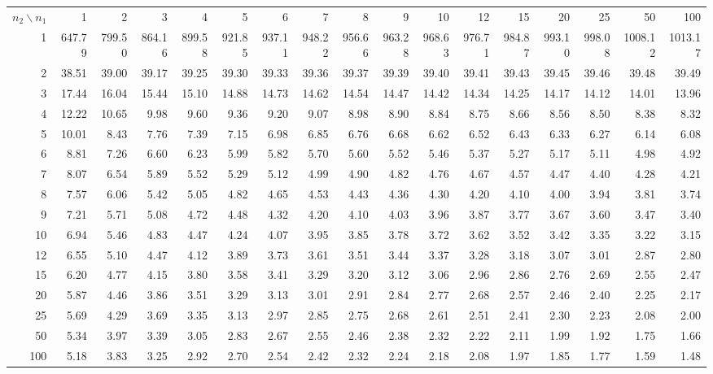 \begin{landscape}
\noindent\begin{tabular}{|*{17}{r|}}
\hline \rowcolor{lightturquoise} \multicolumn{17}{|c|}{97.5--Percentile of  Snedecor's  F--distribution
} \\
  \hline$n_2\backslash n_1$ &  1 & 2 & 3 & 4 & 5 & 6 & 7 & 8 & 9 & 10 & 12 & 15 & 20 & 25 & 50 & 100 \\ 
\hline  1 &  647.79 &  799.50 &  864.16 &  899.58 &  921.85 &  937.11 &  948.22 &  956.66 &  963.28 &  968.63 &  976.71 &  984.87 &  993.10 &  998.08 & 1008.12 & 1013.17 \\ 
\hline  2 & 38.51 & 39.00 & 39.17 & 39.25 & 39.30 & 39.33 & 39.36 & 39.37 & 39.39 & 39.40 & 39.41 & 39.43 & 39.45 & 39.46 & 39.48 & 39.49 \\ 
\hline  3 & 17.44 & 16.04 & 15.44 & 15.10 & 14.88 & 14.73 & 14.62 & 14.54 & 14.47 & 14.42 & 14.34 & 14.25 & 14.17 & 14.12 & 14.01 & 13.96 \\ 
\hline  4 & 12.22 & 10.65 &  9.98 &  9.60 &  9.36 &  9.20 &  9.07 &  8.98 &  8.90 &  8.84 &  8.75 &  8.66 &  8.56 &  8.50 &  8.38 &  8.32 \\ 
\hline  5 & 10.01 &  8.43 &  7.76 &  7.39 &  7.15 &  6.98 &  6.85 &  6.76 &  6.68 &  6.62 &  6.52 &  6.43 &  6.33 &  6.27 &  6.14 &  6.08 \\ 
\hline  6 & 8.81 & 7.26 & 6.60 & 6.23 & 5.99 & 5.82 & 5.70 & 5.60 & 5.52 & 5.46 & 5.37 & 5.27 & 5.17 & 5.11 & 4.98 & 4.92 \\ 
\hline  7 & 8.07 & 6.54 & 5.89 & 5.52 & 5.29 & 5.12 & 4.99 & 4.90 & 4.82 & 4.76 & 4.67 & 4.57 & 4.47 & 4.40 & 4.28 & 4.21 \\ 
\hline  8 & 7.57 & 6.06 & 5.42 & 5.05 & 4.82 & 4.65 & 4.53 & 4.43 & 4.36 & 4.30 & 4.20 & 4.10 & 4.00 & 3.94 & 3.81 & 3.74 \\ 
\hline  9 & 7.21 & 5.71 & 5.08 & 4.72 & 4.48 & 4.32 & 4.20 & 4.10 & 4.03 & 3.96 & 3.87 & 3.77 & 3.67 & 3.60 & 3.47 & 3.40 \\ 
\hline  10 & 6.94 & 5.46 & 4.83 & 4.47 & 4.24 & 4.07 & 3.95 & 3.85 & 3.78 & 3.72 & 3.62 & 3.52 & 3.42 & 3.35 & 3.22 & 3.15 \\ 
\hline  12 & 6.55 & 5.10 & 4.47 & 4.12 & 3.89 & 3.73 & 3.61 & 3.51 & 3.44 & 3.37 & 3.28 & 3.18 & 3.07 & 3.01 & 2.87 & 2.80 \\ 
\hline  15 & 6.20 & 4.77 & 4.15 & 3.80 & 3.58 & 3.41 & 3.29 & 3.20 & 3.12 & 3.06 & 2.96 & 2.86 & 2.76 & 2.69 & 2.55 & 2.47 \\ 
\hline  20 & 5.87 & 4.46 & 3.86 & 3.51 & 3.29 & 3.13 & 3.01 & 2.91 & 2.84 & 2.77 & 2.68 & 2.57 & 2.46 & 2.40 & 2.25 & 2.17 \\ 
\hline  25 & 5.69 & 4.29 & 3.69 & 3.35 & 3.13 & 2.97 & 2.85 & 2.75 & 2.68 & 2.61 & 2.51 & 2.41 & 2.30 & 2.23 & 2.08 & 2.00 \\ 
\hline  50 & 5.34 & 3.97 & 3.39 & 3.05 & 2.83 & 2.67 & 2.55 & 2.46 & 2.38 & 2.32 & 2.22 & 2.11 & 1.99 & 1.92 & 1.75 & 1.66 \\ 
\hline  100 & 5.18 & 3.83 & 3.25 & 2.92 & 2.70 & 2.54 & 2.42 & 2.32 & 2.24 & 2.18 & 2.08 & 1.97 & 1.85 & 1.77 & 1.59 & 1.48 \\ 
\hline
\end{tabular}
\end{landscape}